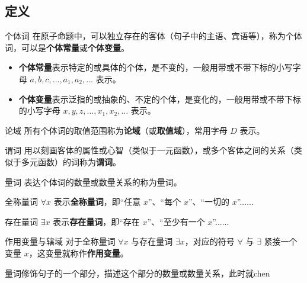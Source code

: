 

\subsection{定义}
\begin{definition}{个体词}
在原子命题中，可以独立存在的客体（句子中的主语、宾语等），称为个体词，可以是\textbf{个体常量}或\textbf{个体变量}。
\begin{itemize}
\item \textbf{个体常量}表示特定的或具体的个体，是不变的，一般用带或不带下标的小写字母 $a, b, c, \dots, a_1, a_2, \dots$ 表示。
\item \textbf{个体变量}表示泛指的或抽象的、不定的个体，是变化的，一般用带或不带下标的小写字母 $x, y, z, \dots, x_1, x_2, \dots$ 表示。
\end{itemize}

\end{definition}
\begin{definition}{论域}
所有个体词的取值范围称为\textbf{论域}（或\textbf{取值域}），常用字母 $D$ 表示。
\end{definition}


\begin{definition}{谓词}
用以刻画客体的属性或心智（类似于一元函数），或多个客体之间的关系（类似于多元函数）的词称为\textbf{谓词}。
\end{definition}

\begin{definition}{量词}
表达个体词的数量或数量关系的称为量词。
\end{definition}

\begin{definition}{全称量词}
$\forall x$ 表示\textbf{全称量词}，即“任意 $x$”、“每个 $x$”、“一切的 $x$”......
\end{definition}
\begin{definition}{存在量词}
$\exists x$ 表示\textbf{存在量词}，即“存在 $x$”、“至少有一个 $x$”......
\end{definition}

\begin{definition}{作用变量与辖域}
对于全称量词 $\forall x$ 与存在量词 $\exists x$，对应的符号 $\forall$ 与 $\exists$ 紧接一个变量 $x$，这变量就称作\textbf{作用变量}。

量词修饰句子的一个部分，描述这个部分的数量或数量关系，此时就chen
\end{definition}


